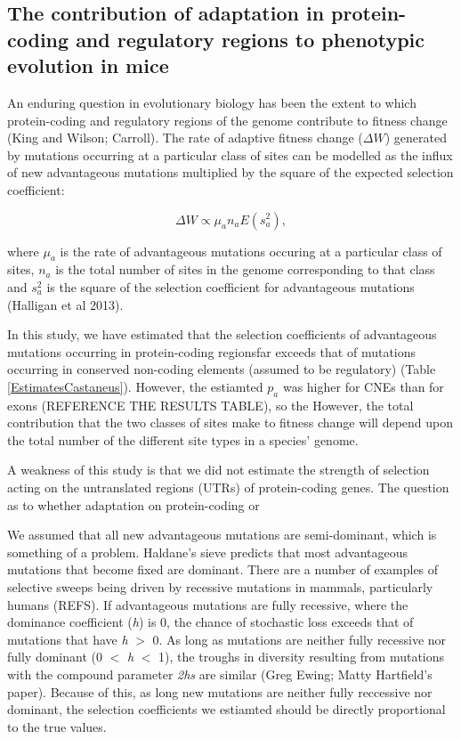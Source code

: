 \documentclass[11pt]{article}
\begin{document}
\subsection*{The contribution of adaptation in protein-coding and regulatory regions to phenotypic evolution in mice}

An enduring question in evolutionary biology has been the extent to which protein-coding and regulatory regions of the genome contribute to fitness change (King and Wilson; Carroll). The rate of adaptive fitness change ($\Delta W$) generated by mutations occurring at a particular class of sites can be modelled as the influx of new advantageous mutations multiplied by the square of the expected selection coefficient:

\begin{equation}
\label{eq:fitness}
\Delta W \propto \mu_a n_a E(s_a^2),
\end{equation}

where $\mu_a$ is the rate of advantageous mutations occuring at a particular class of sites, \textit{$n_a$} is the total number of sites in the genome corresponding to that class and \textit{$s_a^2$} is the square of the selection coefficient for advantageous mutations (Halligan et al 2013). 

In this study, we have estimated that the selection coefficients of advantageous mutations occurring in protein-coding regionsfar exceeds that of mutations occurring in conserved non-coding elements (assumed to be regulatory) (Table \ref{EstimatesCastaneus}). However, the estiamted $p_a$ was higher for CNEs than for exons (REFERENCE THE RESULTS TABLE), so the 
However, the total contribution that the two classes of sites make to fitness change will depend upon the total number of the different site types in a species' genome. 




A weakness of this study is that we did not estimate the strength of selection acting on the untranslated regions (UTRs) of protein-coding genes. The question as to whether adaptation on protein-coding or 

We assumed that all new advantageous mutations are semi-dominant, which is something of a problem. Haldane's sieve predicts that most advantageous mutations that become fixed are dominant. There are a number of examples of selective sweeps being driven by recessive mutations in mammals, particularly humans (REFS). If advantageous mutations are fully recessive, where the dominance coefficient (\textit{h}) is 0, the chance of stochastic loss exceeds that of mutations that have \textit{h} $>$ 0. As long as mutations are neither fully recessive nor fully dominant (0 $<$ \textit{h} $<$ 1), the troughs in diversity resulting from mutations with the compound parameter \textit{2hs} are similar (Greg Ewing; Matty Hartfield's paper). Because of this, as long new mutations are neither fully reccessive nor dominant, the selection coefficients we estiamted should be directly proportional to the true values.
\end{document}
